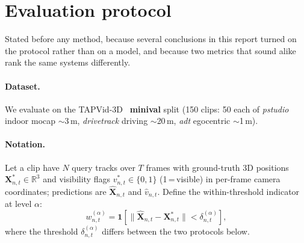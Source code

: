 \documentclass[11pt,a4paper]{article}
\begin{document}
\section{Evaluation protocol}
\label{sec:protocol}
Stated before any method, because several conclusions in this report turned on the
protocol rather than on a model, and because two metrics that sound alike rank the
same systems differently.

\label{sec:metrics}

\paragraph{Dataset.}
We evaluate on the TAPVid-3D~\cite{tapvid3d} \textbf{minival} split (150 clips: 50 each of
\emph{pstudio} indoor mocap $\sim$3\,m, \emph{drivetrack} driving $\sim$20\,m, \emph{adt} egocentric
$\sim$1\,m).

\paragraph{Notation.}
Let a clip have $N$ query tracks over $T$ frames with ground-truth 3D positions
$\mathbf{X}^*_{n,t}\!\in\!\mathbb{R}^3$ and visibility flags $v^*_{n,t}\!\in\!\{0,1\}$
(1\,=\,visible) in per-frame camera coordinates; predictions are
$\hat{\mathbf{X}}_{n,t}$ and $\hat{v}_{n,t}$.
Define the within-threshold indicator at level $\alpha$:
\begin{equation}
  w^{(\alpha)}_{n,t}
  = \mathbf{1}\!\left[\lVert\hat{\mathbf{X}}_{n,t}-\mathbf{X}^*_{n,t}\rVert
    < \delta^{(\alpha)}_{n,t}\right],
  \label{eq:within}
\end{equation}
where the threshold $\delta^{(\alpha)}_{n,t}$ differs between the two protocols below.
\end{document}
